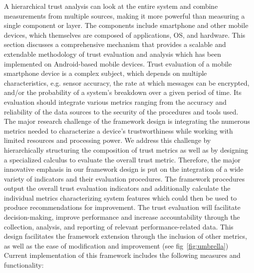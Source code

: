 A hierarchical trust analysis can look at the entire system and combine measurements from multiple sources, making
it more powerful than measuring a single component or layer.  The components include smartphone and other mobile
devices, which themselves are composed of applications, OS, and hardware. 
This section discusses a comprehensive mechanism that provides a scalable and extendable methodology of trust
 evaluation and analysis which has been implemented on Android-based mobile devices.
Trust evaluation of a mobile smartphone device is a complex subject, which depends on multiple characteristics, 
e.g. sensor accuracy, the rate at which messages can be encrypted,
 and/or the probability of a system's breakdown over a given period of time. Its evaluation should integrate various metrics ranging from the accuracy and reliability of the data sources to the security of the procedures and tools used. The major research challenge of the framework design is integrating the numerous metrics needed to characterize a device's trustworthiness while working with limited resources and processing power. 
We address this challenge by hierarchically structuring the composition of trust metrics as well as by designing a specialized calculus to evaluate the overall trust metric. 
Therefore, the major innovative emphasis in our framework design is put on the integration of a wide variety of indicators and their evaluation procedures. The framework procedures output the overall trust evaluation indicators and additionally 
calculate the individual metrics characterizing system features which could then be used to produce recommendations for improvement. 
The trust evaluation will facilitate decision-making, improve performance and increase accountability through the collection, analysis, and reporting of relevant performance-related data. This design facilitates the framework extension through
 the inclusion of other metrics, as well as the ease of modification and improvement (see fig~\ref{fig:umbrella})
Current implementation of this framework includes the following measures and functionality: 

